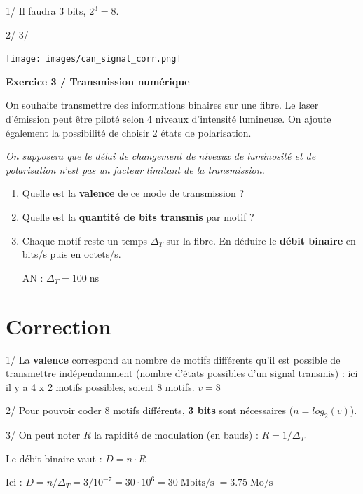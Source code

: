 \documentclass[10pt]{article} %
\begin{document}
1/ Il faudra 3 bits, $2^3 = 8$.

\medskip

2/ 3/

\begin{center}
	\texttt{[image: images/can\_signal\_corr.png]}
\end{center}


\newpage
\textbf{Exercice 3 / Transmission numérique}

On souhaite transmettre des informations binaires sur une fibre. Le laser d'émission peut être piloté selon 4 niveaux d'intensité lumineuse. On ajoute également la possibilité de choisir 2 états de polarisation. 

\textit{On supposera que le délai de changement de niveaux de luminosité et de polarisation n'est pas un facteur limitant de la transmission.}

\begin{enumerate}
	\item Quelle est la \textbf{valence} de ce mode de transmission ?
	\item Quelle est la \textbf{quantité de bits transmis} par motif ?
	\item Chaque motif reste un temps $\Delta_T$ sur la fibre. En déduire le \textbf{débit binaire} en bits/s puis en octets/s. 
	
	\medskip	
	
	AN : $\Delta_T = 100\operatorname{ns}$
\end{enumerate}


\section*{Correction}

1/ La \textbf{valence} correspond au nombre de motifs différents qu'il est possible de transmettre indépendamment (nombre d'états possibles d'un signal transmis) : ici il y a 4 x 2 motifs possibles, soient 8 motifs.  \textbf{$v = 8$}

\medskip

2/ Pour pouvoir coder 8 motifs différents, \textbf{3 bits} sont nécessaires ($n = log_2(v)$).

\medskip

3/ On peut noter $R$ la rapidité de modulation (en bauds) : $R = 1 / \Delta_T$

Le débit binaire vaut : $D = n \cdot R$ 

Ici : $D = n / \Delta_T = 3 / 10^{-7} = 30 \cdot 10^6 = 30\operatorname{Mbits/s} = 3.75\operatorname{Mo/s}$
\end{document}
